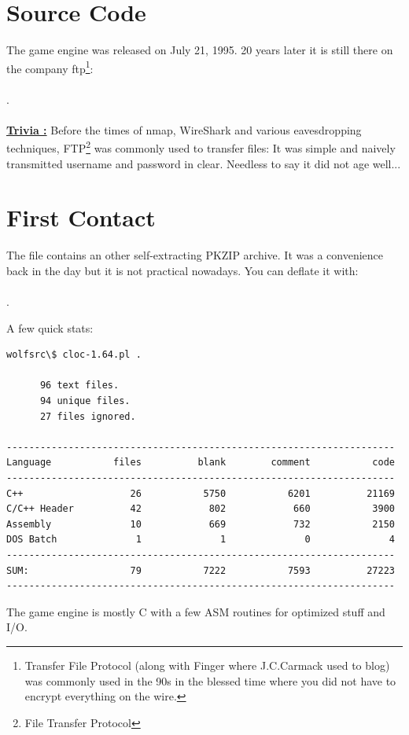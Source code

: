 \documentclass[book.tex]{subfiles}
\begin{document}
\section{Source Code}
The game engine was released on July 21, 1995. 20 years later it is still there on the company ftp\footnote{Transfer File Protocol (along with Finger where J.C.Carmack used to blog) was commonly used in the 90s in the blessed time where you did not have to encrypt everything on the wire.}:\\ 
\\.\\
\\
\textbf{\underline{Trivia :}} Before the times of nmap, WireShark and various eavesdropping techniques, FTP\footnote{File Transfer Protocol} was commonly used to transfer files: It was simple and naively transmitted username and password in clear. Needless to say it did not age well...\\

\section{First Contact}
The file  contains an other self-extracting PKZIP archive. It was a convenience back in the day but it is not practical nowadays. You can deflate it with:\\
\\.\\
\par
A few quick stats:\\
\begin{verbatim}
wolfsrc\$ cloc-1.64.pl .

      96 text files.
      94 unique files.                              
      27 files ignored.

---------------------------------------------------------------------
Language           files          blank        comment           code
---------------------------------------------------------------------
C++                   26           5750           6201          21169
C/C++ Header          42            802            660           3900
Assembly              10            669            732           2150
DOS Batch              1              1              0              4
---------------------------------------------------------------------
SUM:                  79           7222           7593          27223
---------------------------------------------------------------------
\end{verbatim}
The game engine is mostly C with a few ASM routines for optimized stuff and I/O.\\
\end{document}
